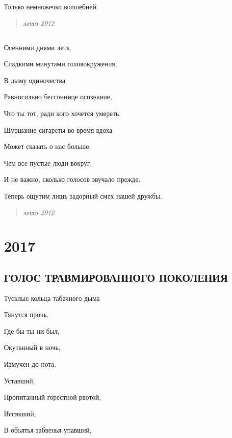 \documentclass[
  a5paperpaper,
  DIV=11,
  numbers=noendperiod]{scrreprt}
\begin{document}
Только немножечко волшебней.

\begin{quote}
\emph{лето 2012}
\end{quote}

\section{}\label{section-5}

Осенними днями лета,

Сладкими минутами головокружения,

В дыму одиночества

Равносильно бессоннице осознание,

Что ты тот, ради кого хочется умереть.

Шуршание сигареты во время вдоха

Может сказать о нас больше,

Чем все пустые люди вокруг.

И не важно, сколько голосов звучало прежде.

Теперь ощутим лишь задорный смех нашей дружбы.

\begin{quote}
\emph{лето 2012}
\end{quote}


\chapter{2017}\label{section-6}

\section{ГОЛОС ТРАВМИРОВАННОГО
ПОКОЛЕНИЯ}\label{ux433ux43eux43bux43eux441-ux442ux440ux430ux432ux43cux438ux440ux43eux432ux430ux43dux43dux43eux433ux43e-ux43fux43eux43aux43eux43bux435ux43dux438ux44f}

Тусклые кольца табачного дыма

Тянутся прочь.

Где бы ты ни был,

Окутанный в ночь,

Измучен до пота,

Уставший,

Пропитанный горестной рвотой,

Иссякший,

В объятья забвенья упавший,
\end{document}
